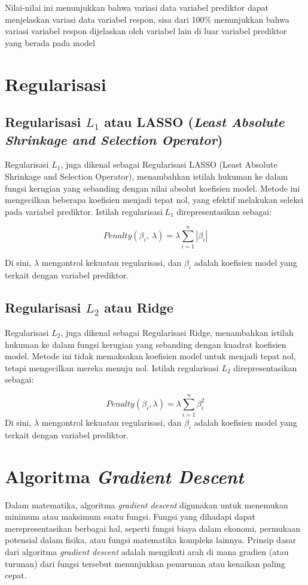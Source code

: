 Nilai-nilai ini menunjukkan bahwa variasi data variabel prediktor dapat
menjelaskan variasi data variabel respon, sisa dari 100\% menunjukkan
bahwa variasi variabel respon dijelaskan oleh variabel lain di luar
variabel prediktor yang berada pada model
%
\section{Regularisasi}
\subsection{Regularisasi $L_1$ atau LASSO (\emph{Least Absolute Shrinkage and Selection Operator})}
Regularisasi \(L_{1}\), juga dikenal sebagai Regularisasi LASSO (Least
Absolute Shrinkage and Selection Operator), menambahkan istilah hukuman
ke dalam fungsi kerugian yang sebanding dengan nilai absolut koefisien
model. Metode ini mengecilkan beberapa koefisien menjadi tepat nol, yang
efektif melakukan seleksi pada variabel prediktor. Istilah
regularisasi\(\ L_{1}\) direpresentasikan sebagai:

\begin{equation}\label{penaltyL1}
    Penalty\left( \beta_{i},\ \lambda \right) = \lambda\sum_{i = 1}^{n}\left| \beta_{i} \right|
\end{equation}

Di sini, \(\lambda\) mengontrol kekuatan regularisasi, dan \(\beta_{i}\)
adalah koefisien model yang terkait dengan variabel prediktor\citep*{Hastie2009}.

%
\subsection{Regularisasi $L_2$ atau Ridge}
Regularisasi \(L_{2}\), juga dikenal sebagai Regularisasi Ridge,
menambahkan istilah hukuman ke dalam fungsi kerugian yang sebanding
dengan kuadrat koefisien model. Metode ini tidak memaksakan koefisien
model untuk menjadi tepat nol, tetapi mengecilkan mereka menuju nol.
Istilah regularisasi \(L_{2}\) direpresentasikan sebagai:

\begin{equation}\label{penaltyL2}
    Penalty\left( \beta_{i},\lambda \right) = \lambda\sum_{i = 1}^{n}\beta_{i}^{2}
\end{equation}
Di sini, $\lambda$ mengontrol kekuatan regularisasi, dan \(\beta_{i}\) adalah
koefisien model yang terkait dengan variabel prediktor\citep*{Bishop2006}.

\section{Algoritma \emph{Gradient Descent}}
Dalam matematika, algoritma \emph{gradient descent} digunakan untuk
menemukan minimum atau maksimum suatu fungsi. Fungsi yang dihadapi dapat
merepresentasikan berbagai hal, seperti fungsi biaya dalam ekonomi,
permukaan potensial dalam fisika, atau fungsi matematika kompleks
lainnya. Prinsip dasar dari algoritma \emph{gradient descent} adalah
mengikuti arah di mana gradien (atau turunan) dari fungsi tersebut
menunjukkan penurunan atau kenaikan paling cepat.

